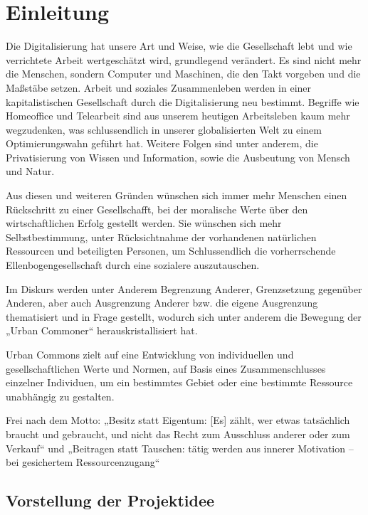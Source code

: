 \chapter{Einleitung} \label{Einleitung}

Die Digitalisierung hat unsere Art und Weise, wie die Gesellschaft lebt und wie verrichtete Arbeit wertgeschätzt wird, grundlegend verändert. Es sind nicht mehr die Menschen, sondern Computer und Maschinen, die den Takt vorgeben und die Maßstäbe setzen. Arbeit und soziales Zusammenleben werden in einer kapitalistischen Gesellschaft durch die Digitalisierung neu bestimmt. Begriffe wie Homeoffice und Telearbeit sind aus unserem heutigen Arbeitsleben kaum mehr wegzudenken, was schlussendlich in unserer globalisierten Welt zu einem Optimierungswahn geführt hat. Weitere Folgen sind unter anderem, die Privatisierung von Wissen und Information, sowie die Ausbeutung von Mensch und Natur.

Aus diesen und weiteren Gründen wünschen sich immer mehr Menschen einen Rückschritt zu einer Gesellschafft, bei der moralische Werte über den wirtschaftlichen Erfolg gestellt werden.
Sie wünschen sich mehr Selbstbestimmung, unter Rücksichtnahme der vorhandenen natürlichen Ressourcen und beteiligten Personen, um Schlussendlich die vorherrschende Ellenbogengesellschaft durch eine sozialere auszutauschen.

Im Diskurs werden unter Anderem Begrenzung Anderer, Grenzsetzung gegenüber Anderen, aber auch Ausgrenzung Anderer bzw. die eigene Ausgrenzung thematisiert und in Frage gestellt, wodurch sich unter anderem die Bewegung der „Urban Commoner“ herauskristallisiert hat.

Urban Commons zielt auf eine Entwicklung von individuellen und gesellschaftlichen Werte und Normen, auf Basis eines Zusammenschlusses einzelner Individuen, um ein bestimmtes Gebiet oder eine bestimmte Ressource unabhängig zu gestalten.

Frei nach dem Motto: „Besitz statt Eigentum: [Es] zählt, wer etwas tatsächlich braucht und gebraucht, und nicht das Recht zum Ausschluss anderer oder zum Verkauf“ und  „Beitragen statt Tauschen: tätig werden aus innerer Motivation – bei gesichertem Ressourcenzugang“\cite{commonzukunft}

\section{Vorstellung der Projektidee} \label{Vorstellung der Projektidee}

